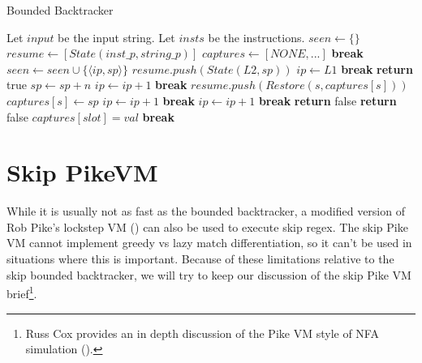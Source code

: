 \begin{algorithm}
\caption{Bounded Backtracker} \label{algo:loopboundedback}
\begin{algorithmic}
\State Let $input$ be the input string.
\State Let $insts$ be the instructions.
  \State $seen \gets \{\}$
  \State $resume \gets [State(inst\_p, string\_p)]$
  \State $captures \gets [NONE, ...]$
          \State \textbf{break}
        \EndIf
        \State $seen \gets seen \cup \{\langle ip, sp \rangle\}$
              \State $resume.push(State(L2, sp))$
              \State $ip \gets L1$
              \State \textbf{break}
            \EndCase
              \State \textbf{return} true
            \EndCase
              \State $sp \gets sp + n$
              \State $ip \gets ip + 1$
              \State \textbf{break}
            \EndCase
              \State $resume.push(Restore(s, captures[s]))$
              \State $captures[s] \gets sp$
              \State $ip \gets ip + 1$
              \State \textbf{break}
            \EndCase
                \State $ip \gets ip + 1$
                \State \textbf{break}
              \Else
                \State \textbf{return} false
              \EndIf
            \EndCase
          \EndSwitch
        \EndWhile
        \State \textbf{return} false
      \EndCase
        \State $captures[slot] = val$
        \State \textbf{break}
      \EndCase
    \EndSwitch
  \EndWhile
\EndProcedure
\end{algorithmic}
\end{algorithm}

\section{Skip PikeVM}

While it is usually not as fast as the bounded backtracker,
a modified version of Rob Pike's lockstep VM (\cite{Pike1987})
can also be used to execute skip regex. The skip Pike VM cannot
implement greedy vs lazy match differentiation, so it can't be
used in situations where this is important. Because of these
limitations relative to the skip bounded backtracker, we will
try to keep our discussion of the skip Pike VM brief\footnote{
Russ Cox provides an in depth discussion of the Pike VM style
of NFA simulation (\cite{CoxVirtualMachineApproach}).
}.

